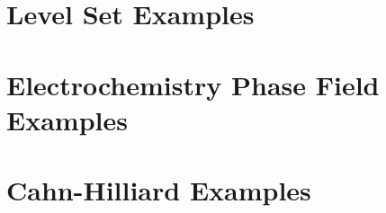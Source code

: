 \documentclass[letterpaper]{book}
\begin{document}
\chapter{Level Set Examples}


\newpage

\newpage

\newpage

\newpage

\newpage

\newpage

\chapter{Electrochemistry Phase Field Examples}


\newpage

\newpage

\newpage

\newpage

\newpage

\newpage

\newpage

\newpage

\newpage

\newpage

\newpage

\chapter{Cahn-Hilliard Examples}


\newpage


% 
% 
% 
% 
% 
 
% 
% 
% 
% 
% 
% 

\backmatter


\printindex
\end{document}
